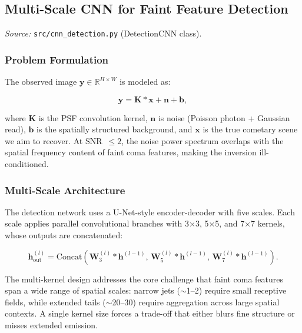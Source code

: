 \documentclass[usenatbib]{mnras}
\begin{document}
\subsection{Multi-Scale CNN for Faint Feature Detection}

\textit{Source:} \texttt{src/cnn\_detection.py} (DetectionCNN class).

\subsubsection{Problem Formulation}

The observed image $\mathbf{y} \in \mathbb{R}^{H \times W}$ is modeled as:

\begin{equation}\label{eq:forward_model}
\mathbf{y} = \mathbf{K} * \mathbf{x} + \mathbf{n} + \mathbf{b},
\end{equation}

where $\mathbf{K}$ is the PSF convolution kernel, $\mathbf{n}$ is noise (Poisson photon + Gaussian read), $\mathbf{b}$ is the spatially structured background, and $\mathbf{x}$ is the true cometary scene we aim to recover. At SNR~$\leq 2$, the noise power spectrum overlaps with the spatial frequency content of faint coma features, making the inversion ill-conditioned.

\subsubsection{Multi-Scale Architecture}

The detection network uses a U-Net-style encoder-decoder \citep{ronneberger15} with five scales. Each scale applies parallel convolutional branches with 3$\times$3, 5$\times$5, and 7$\times$7 kernels, whose outputs are concatenated:

\begin{equation}\label{eq:multi_kernel}
\mathbf{h}_{\text{out}}^{(l)} = \text{Concat}\left(\mathbf{W}_3^{(l)} * \mathbf{h}^{(l-1)},\, \mathbf{W}_5^{(l)} * \mathbf{h}^{(l-1)},\, \mathbf{W}_7^{(l)} * \mathbf{h}^{(l-1)}\right).
\end{equation}

The multi-kernel design addresses the core challenge that faint coma features span a wide range of spatial scales: narrow jets ($\sim$1--2\arcsec) require small receptive fields, while extended tails ($\sim$20--30\arcsec) require aggregation across large spatial contexts. A single kernel size forces a trade-off that either blurs fine structure or misses extended emission.
\end{document}
